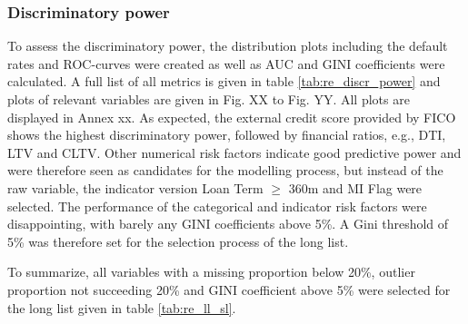 \subsubsection{Discriminatory power}
To assess the discriminatory power, the distribution plots including the default rates and ROC-curves were created as well as AUC and GINI coefficients were calculated. A full list of all metrics is given in table \ref{tab:re_discr_power} and plots of relevant variables are given in Fig. XX to Fig. YY. All plots are displayed in Annex xx. As expected, the external credit score provided by FICO shows the highest discriminatory power, followed by financial ratios, e.g., DTI, LTV and CLTV. Other numerical risk factors indicate good predictive power and were therefore seen as candidates for the modelling process, but instead of the raw variable, the indicator version Loan Term $\geq$ 360m and MI Flag were selected. The performance of the categorical and indicator risk factors were disappointing, with barely any GINI coefficients above 5\%. A Gini threshold of 5\% was therefore set for the selection process of the long list. 

To summarize, all variables with a missing proportion below 20\%, outlier proportion not succeeding 20\% and GINI coefficient above 5\% were selected for the long list given in table \ref{tab:re_ll_sl}. 

